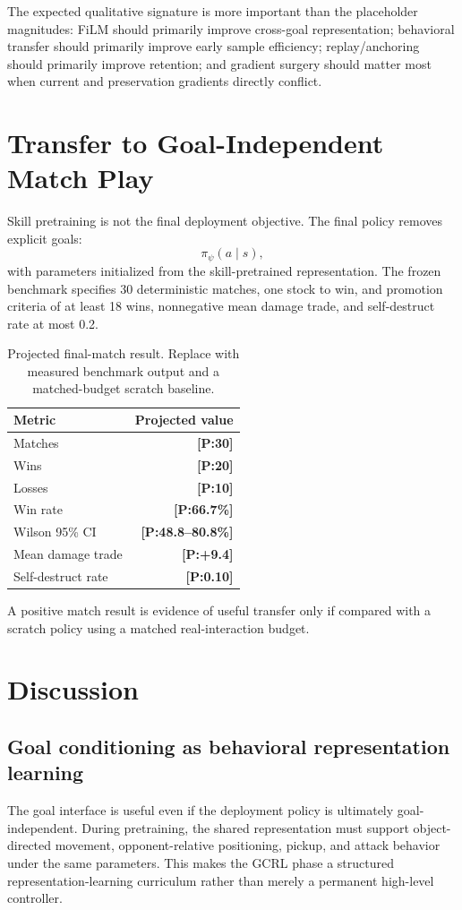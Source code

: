 \documentclass[11pt]{article}
\newcommand{\projected}[1]{\textcolor{Projection}{\textbf{[P:#1]}}}
\begin{document}
The expected qualitative signature is more important than the placeholder magnitudes: FiLM should primarily improve cross-goal representation; behavioral transfer should primarily improve early sample efficiency; replay/anchoring should primarily improve retention; and gradient surgery should matter most when current and preservation gradients directly conflict.

\section{Transfer to Goal-Independent Match Play}
Skill pretraining is not the final deployment objective. The final policy removes explicit goals:
\begin{equation}
\pi_\psi(a\mid s),
\end{equation}
with parameters initialized from the skill-pretrained representation. The frozen benchmark specifies 30 deterministic matches, one stock to win, and promotion criteria of at least 18 wins, nonnegative mean damage trade, and self-destruct rate at most 0.2.

\begin{table}[t]
\centering
\caption{Projected final-match result. Replace with measured benchmark output and a matched-budget scratch baseline.}
\label{tab:match}
\begin{tabular}{lr}
\toprule
Metric & Projected value\\
\midrule
Matches & \projected{30}\\
Wins & \projected{20}\\
Losses & \projected{10}\\
Win rate & \projected{66.7\%}\\
Wilson 95\% CI & \projected{48.8--80.8\%}\\
Mean damage trade & \projected{+9.4}\\
Self-destruct rate & \projected{0.10}\\
\bottomrule
\end{tabular}
\end{table}

A positive match result is evidence of useful transfer only if compared with a scratch policy using a matched real-interaction budget.

\section{Discussion}
\subsection{Goal conditioning as behavioral representation learning}
The goal interface is useful even if the deployment policy is ultimately goal-independent. During pretraining, the shared representation must support object-directed movement, opponent-relative positioning, pickup, and attack behavior under the same parameters. This makes the GCRL phase a structured representation-learning curriculum rather than merely a permanent high-level controller.
\end{document}
